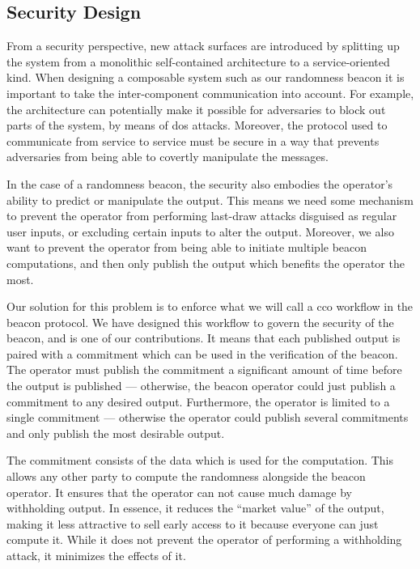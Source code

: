 \subsection{Security Design}%
\label{sub:security_design}

From a security perspective, new attack surfaces are introduced by splitting up the system from a monolithic self-contained architecture to a service-oriented kind.
When designing a composable system such as our randomness beacon it is important to take the inter-component communication into account.
For example, the architecture can potentially make it possible for adversaries to block out parts of the system, by means of \gls{dos} attacks.
Moreover, the protocol used to communicate from service to service must be secure in a way that prevents adversaries from being able to covertly manipulate the messages.

In the case of a randomness beacon, the security also embodies the operator's ability to predict or manipulate the output.
This means we need some mechanism to prevent the operator from performing last-draw attacks disguised as regular user inputs, or excluding certain inputs to alter the output.
Moreover, we also want to prevent the operator from being able to initiate multiple beacon computations, and then only publish the output which benefits the operator the most.

Our solution for this problem is to enforce what we will call a \gls{cco} workflow in the beacon protocol. We have designed this workflow to govern the security of the beacon, and is one of our contributions.
It means that each published output is paired with a commitment which can be used in the verification of the beacon.
The operator must publish the commitment a significant amount of time before the output is published --- otherwise, the beacon operator could just publish a commitment to any desired output.
Furthermore, the operator is limited to a single commitment --- otherwise the operator could publish several commitments and only publish the most desirable output.

The commitment consists of the data which is used for the computation.
This allows any other party to compute the randomness alongside the beacon operator.
It ensures that the operator can not cause much damage by withholding output. In essence, it reduces the \enquote{market value} of the output, making it less attractive to sell early access to it because everyone can just compute it. While it does not prevent the operator of performing a withholding attack, it minimizes the effects of it.

